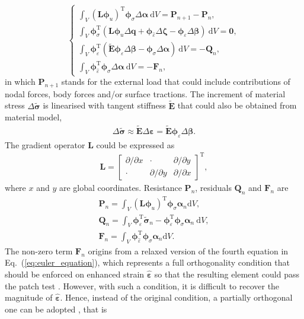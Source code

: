 \documentclass[3p,sort&compress,review,11pt]{elsarticle}
\newcommand*{\md}[1]{\mathrm{d}#1}
\newcommand*{\mT}{\mathrm{T}}
\newcommand*{\eqsref}[1]{Eq.~(\ref{#1})}
\newcommand*{\mb}{\bm}
\begin{document}
\begin{equation}
\left\{\begin{array}{l}
\displaystyle\int_V\left(\mb{L}\mb{\phi}_u\right)^\mT\mb{\phi}_\sigma\Delta\mb{\alpha}~\md{V}=\mb{P}_{n+1}-\mb{P}_n,\\[3mm]
\displaystyle\int_V\mb{\phi}_\sigma^\mT\left(\mb{L}\mb{\phi}_u\Delta\mb{q}+\mb{\phi}_{\hat{\varepsilon}}\Delta\mb{\zeta}-\mb{\phi}_\varepsilon\Delta\mb{\beta}\right)~\md{V}=\mb{0},\\[3mm]
\displaystyle\int_V\mb{\phi}_\varepsilon^\mT\left(\tilde{\mb{E}}\mb{\phi}_\varepsilon\Delta\mb{\beta}-\mb{\phi}_\sigma\Delta\mb{\alpha}\right)~\md{V}=-\mb{Q}_n,\\[3mm]
\displaystyle\int_V\mb{\phi}_{\hat{\varepsilon}}^\mT\mb{\phi}_\sigma\Delta\mb{\alpha}~\md{V}=-\mb{F}_n,
\end{array}\right.
\end{equation}
in which $\mb{P}_{n+1}$ stands for the external load that could include contributions of nodal forces, body forces and/or surface tractions. The increment of material stress $\Delta\tilde{\mb{\sigma}}$ is linearised with tangent stiffness $\tilde{\mb{E}}$ that could also be obtained from material model,
\begin{gather}
\Delta\tilde{\mb{\sigma}}\approx\tilde{\mb{E}}\Delta\mb{\varepsilon}=\tilde{\mb{E}}\mb{\phi}_\varepsilon\Delta\mb{\beta}.
\end{gather}
The gradient operator $\mb{L}$ could be expressed as
\begin{gather*}
\mb{L}=\begin{bmatrix}
\partial/\partial{}x&\cdot&\partial/\partial{}y\\[3mm]
\cdot&\partial/\partial{}y&\partial/\partial{}x
\end{bmatrix}^\mT,
\end{gather*}
where $x$ and $y$ are global coordinates. Resistance $\mb{P}_n$, residuals $\mb{Q}_n$ and $\mb{F}_n$ are
\begin{gather}
\mb{P}_n=\int_V\left(\mb{L}\mb{\phi}_u\right)^\mT\mb{\phi}_\sigma\mb{\alpha}_n\md{V},\\
\mb{Q}_n=\int_V\mb{\phi}_\varepsilon^\mT\tilde{\mb{\sigma}}_n-\mb{\phi}_\varepsilon^\mT\mb{\phi}_\sigma\mb{\alpha}_n~\md{V},\\
\mb{F}_n=\int_V\mb{\phi}_{\hat{\varepsilon}}^\mT\mb{\phi}_\sigma\mb{\alpha}_n\md{V}.
\end{gather}
The non-zero term $\mb{F}_n$ origins from a relaxed version of the fourth equation in \eqsref{eq:euler_equation}, which represents a full orthogonality condition that should be enforced on enhanced strain $\hat{\mb{\varepsilon}}$ so that the resulting element could pass the patch test \citep{Simo1990}. However, with such a condition, it is difficult to recover the magnitude of $\hat{\mb{\varepsilon}}$. Hence, instead of the original condition, a partially orthogonal one can be adopted \citep{Piltner1995}, that is
\end{document}
